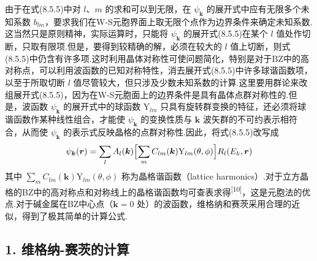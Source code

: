 由于在式(8.5.5)中对 $l$、$m$ 的求和可以到无限，在 $\psi_{\boldsymbol{k}}$ 的展开式中应有无限多个未知系数 $b_{lm}$，要求我们在W-S元胞界面上取无限个点作为边界条件来确定未知系数.这当然只是原则精神，实际运算时，只能将 $\psi_{\boldsymbol{k}}$ 的展开式(8.5.5)在某个 $l$ 值处作切断，只取有限项.但是，要得到较精确的解，必须在较大的 $l$ 值上切断，则式(8.5.5)中仍含有许多项.这时利用晶体对称性可使问题简化，特别是对于BZ中的高对称点，可以利用波函数的已知对称特性，消去展开式(8.5.5)中许多球谐函数项，以至于所取切断 $l$ 值尽管较大，但只涉及少数未知系数的计算.这里要用群论来改组展开式(8.5.5)，因为在W-S元胞面上的边界条件是具有晶体点群对称性的.但是，波函数 $\psi_{\boldsymbol{k}}$ 的展开式中的球函数 $\mathrm{Y}_{lm}$ 只具有旋转群变换的特征，还必须将球谐函数作某种线性组合，才能使 $\psi_{\boldsymbol{k}}$ 的变换性质与 $\boldsymbol{k}$ 波矢群的不可约表示相符合，从而使 $\psi_{\boldsymbol{k}}$ 的表示式反映晶格的点群对称性.因此，将式(8.5.5)改写成
\begin{equation}
  \psi_{\boldsymbol{k}}(\boldsymbol{r})=\sum_{l}A_{l}(\boldsymbol{k})\Bigl[\sum_{m}C_{lm}(\boldsymbol{k})\mathrm{Y}_{lm}(\theta,\phi)\Bigr]R_{l}(E_{k},\boldsymbol{r})
\end{equation}
其中 $\sum_{m}C_{lm}(\boldsymbol{k})\mathrm{Y}_{lm}(\theta,\phi)$ 称为晶格谐函数（lattice harmonics）.对于立方晶格的BZ中的高对称点和对称线上的晶格谐函数均可查表求得\textsuperscript{[10]}，这是元胞法的优点.对于碱金属在BZ中心点（$\boldsymbol{k}=0$ 处）的波函数，维格纳和赛茨采用合理的近似，得到了极其简单的计算公式.

\subsection*{1. 维格纳-赛茨的计算}

